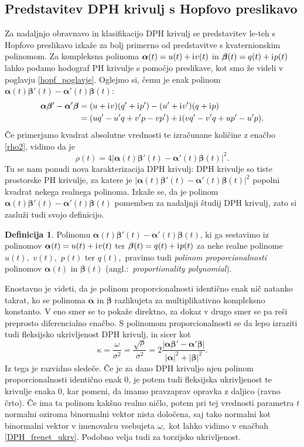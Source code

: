 \documentclass[12pt,a4paper,twoside]{article}
\newcommand{\iu}{\mathrm{i}\mkern1mu} %
\theoremstyle{definition} %
\newtheorem{definicija}{Definicija}[section]
\theoremstyle{plain} %
\theoremstyle{primerstyle}
\numberwithin{equation}{section}  %
\newcommand{\balpha}{\boldsymbol \alpha}
\newcommand{\bbeta}{\boldsymbol \beta}
\begin{document}
\subsection{Predstavitev DPH krivulj s Hopfovo preslikavo}

Za nadaljnjo obravnavo in klasifikacijo DPH krivulj se predstavitev le-teh s Hopfovo preslikavo izkaže za bolj primerno od predstavitve s kvaternionskim polinomom. Za kompleksna polinoma $\balpha(t)=u(t)+\iu v(t)$ in $\bbeta(t)=q(t)+\iu p(t)$ lahko podamo hodograf PH krivulje s pomočjo preslikave, kot smo že videli v poglavju \ref{hopf_poglavje}. Oglejmo si, čemu je enak polinom $\balpha(t)\bbeta'(t)-\balpha'(t)\bbeta(t)$:
\begin{align}
	\balpha\bbeta'-\balpha'\bbeta&=(u+\iu v)(q'+\iu p')-(u'+\iu v')(q+\iu p) \nonumber \\
	&=(uq'-u'q+v'p-vp')+\iu(vq'-v'q+up'-u'p).
\end{align}
Če primerjamo kvadrat absolutne vrednosti te izračunane količine z enačbo \eqref{rho2}, vidimo da je
\begin{equation}
	\label{rho_propoly}
	\rho(t)=4|\balpha(t)\bbeta'(t)-\balpha'(t)\bbeta(t)|^2.
\end{equation}
Tu se nam ponudi nova karakterizacija DPH krivulj: DPH krivulje so tiste prostorske PH krivulje, za katere je $|\balpha(t)\bbeta'(t)-\balpha'(t)\bbeta(t)|^2$ popolni kvadrat nekega realnega polinoma. Izkaže se, da je polinom $\balpha(t)\bbeta'(t)-\balpha'(t)\bbeta(t)$ pomemben za nadaljnji študij DPH krivulj, zato si zasluži tudi svojo definicijo.
\begin{definicija}
	Polinomu $\balpha(t)\bbeta'(t)-\balpha'(t)\bbeta(t)$, ki ga sestavimo iz polinomov $\balpha(t)=u(t)+\iu v(t)$ ter $\bbeta(t)=q(t)+\iu p(t)$ za neke realne polinome $u(t),$ $v(t),$ $p(t)$ ter $q(t),$ pravimo tudi \emph{polinom proporcionalnosti} polinomov $\balpha(t)$ in $\bbeta(t)$ (angl.:\ \emph{proportionality polynomial}).
\end{definicija}
Enostavno je videti, da je polinom proporcionalnosti identično enak nič natanko takrat, ko se polinoma $\balpha$ in $\bbeta$ razlikujeta za multiplikativno kompleksno konstanto. V eno smer se to pokaže direktno, za dokaz v drugo smer se pa reši preprosto diferencialno enačbo.
S polinomom proporcionalnosti se da lepo izraziti tudi fleksijsko ukrivljenost DPH krivulj, in sicer kot
\begin{equation}
	\label{kappa_propoly}
	\kappa=\frac{\omega}{\sigma^2}=\frac{\sqrt{\rho}}{\sigma^2}=2\frac{|\balpha\bbeta'-\balpha'\bbeta|}{|\balpha|^2+|\bbeta|^2}.
\end{equation}
Iz tega je razvidno sledeče. Če je za dano DPH krivuljo njen polinom proporcionalnosti identično enak 0, je potem tudi fleksijska ukrivljenost te krivulje enaka 0, kar pomeni, da imamo pravzaprav opravka z daljico (ravno črto). Če ima ta polinom kakšno realno ničlo, potem pri tej vrednosti parametra $t$ normalni oziroma binormalni vektor nista določena, saj tako normalni kot binormalni vektor v imenovalcu vsebujeta $\omega,$ kot lahko vidimo v enačbah \eqref{DPH_frenet_ukrv}. Podobno velja tudi za torzijsko ukrivljenost.
\end{document}
